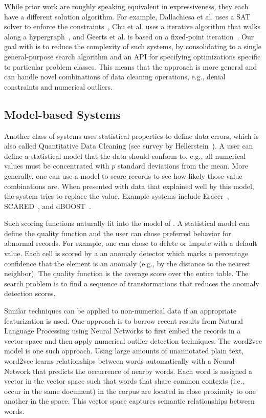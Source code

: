 While prior work are roughly speaking equivalent in expressiveness, they each have a different solution algorithm.
For example, Dallachiesa et al. uses a SAT solver to enforce the constraints~\cite{DBLP:conf/sigmod/DallachiesaEEEIOT13}, Chu et al. uses a iterative algorithm that walks along a hypergraph~\cite{chu2013holistic}, and Geerts et al. is based on a fixed-point iteration~\cite{geerts2013llunatic}.
Our goal with \sys is to reduce the complexity of such systems, by consolidating to a single general-purpose search algorithm and an API for specifying optimizations specific to particular problem classes.
This means that the approach is more general and can handle novel combinations of data cleaning operations, e.g., denial constraints and numerical outliers.

\subsection{Model-based Systems}
Another class of systems uses statistical properties to define data errors, which is also called Quantitative Data Cleaning (see survey by Hellerstein~\cite{hellerstein2008quantitative}).
A user can define a statistical model that the data should conform to, e.g., all numerical values must be concentrated with $p$ standard deviations from the mean. 
More generally, one can use a model to score records to see how likely those value combinations are.
When presented with data that explained well by this model, the system tries to replace the value.
Example systems include Eracer~\cite{eracer}, SCARED~\cite{yakout2013don}, and dBOOST~\cite{pit2016outlier}.

Such scoring functions naturally fit into the model of \sys.
A statistical model can define the quality function and the user can chose preferred behavior for abnormal records.
For example, one can chose to delete or impute with a default value. Each cell is scored by a an anomaly detector which marks a percentage confidence that the element is an anomaly (e.g., by the distance to the nearest neighbor). The quality function is the average score over the entire table.
The search problem is to find a sequence of transformations that reduces the anomaly detection scores.

Similar techniques can be applied to non-numerical data if an appropriate featurization is used.
One approach is to borrow recent results from Natural Language Processing using Neural Networks to first embed the records in a vector-space and then apply numerical outlier detection techniques. The \textsf{word2vec} model \cite{mikolov2013distributed} is one such approach.
Using large amounts of unannotated plain text, \textsf{word2vec} learns relationships between words automatically with a Neural Network that predicts the occurrence of nearby words.
 Each word is assigned a vector in the vector space such that words that share common contexts (i.e., occur in the same document) in the corpus are located in close proximity to one another in the space.
 This vector space captures semantic relationships between words.
 
